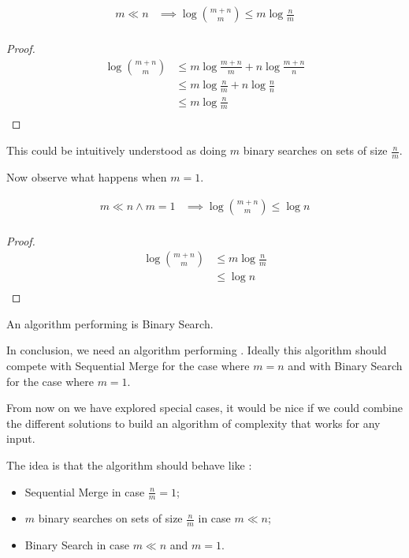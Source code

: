 \begin{lemma}
\begin{align*}
m \ll n &\implies \log\binom{m+n}{m} \leq m \log\frac{n}{m}\\
\end{align*}
\end{lemma}

\begin{proof}
\begin{align*}
\log\binom{m+n}{m} &\leq m \log\frac{m+n}{m} + n \log\frac{m+n}{n}\\
&\leq m \log\frac{n}{m} + n \log\frac{n}{n}\\
&\leq m \log\frac{n}{m}\\
\end{align*}
\end{proof}


This could be intuitively understood as doing $m$ binary searches on sets of
size $\frac{n}{m}$.


Now observe what happens when $m = 1$.

\begin{lemma}
\begin{align*}
m \ll n \land m = 1 &\implies \log\binom{m+n}{m} \leq \log n\\
\end{align*}
\end{lemma}

\begin{proof}
\begin{align*}
\log\binom{m+n}{m} &\leq m \log\frac{n}{m}\\
&\leq \log n\\
\end{align*}
\end{proof}

An algorithm performing  is Binary Search.


In conclusion, we need an algorithm performing .
Ideally this algorithm should compete with Sequential Merge for the case where
$m = n$ and with Binary Search for the case where $m = 1$.


From now on we have explored special cases, it would be nice if we could
combine the different solutions to build an algorithm of complexity  that works for any input.

The idea is that the algorithm should behave like :

\begin{itemize}
\item Sequential Merge in case $\frac{n}{m} = 1$;
\item $m$ binary searches on sets of size $\frac{n}{m}$ in case $m \ll n$;
\item Binary Search in case \(m \ll n\) and \(m = 1\).
\end{itemize}

